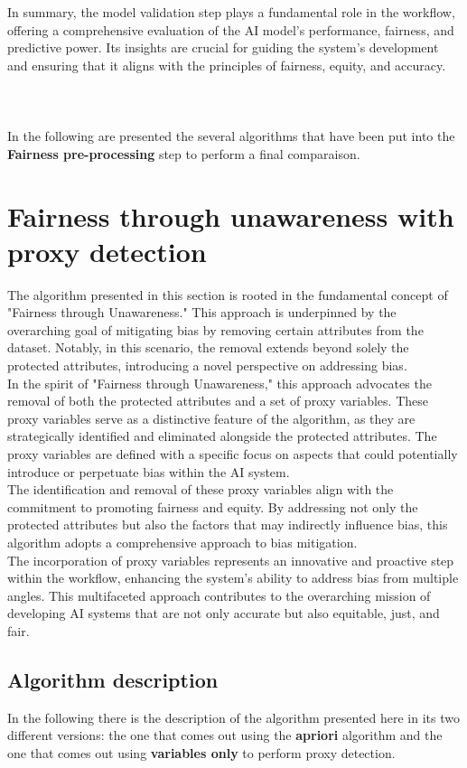 \documentclass[12pt,a4paper,openright,twoside]{book}
\begin{document}
In summary, the model validation step plays a fundamental role in the workflow, offering a comprehensive evaluation of the AI model's performance, fairness, and predictive power. Its insights are crucial for guiding the system's development and ensuring that it aligns with the principles of fairness, equity, and accuracy. \\
\\
\\
\\
In the following are presented the several algorithms that have been put into the \textbf{Fairness pre-processing} step to perform a final comparaison.

\section{Fairness through unawareness with proxy detection}
The algorithm presented in this section is rooted in the fundamental concept of "Fairness through Unawareness." This approach is underpinned by the overarching goal of mitigating bias by removing certain attributes from the dataset. Notably, in this scenario, the removal extends beyond solely the protected attributes, introducing a novel perspective on addressing bias. \\
In the spirit of "Fairness through Unawareness," this approach advocates the removal of both the protected attributes and a set of proxy variables. These proxy variables serve as a distinctive feature of the algorithm, as they are strategically identified and eliminated alongside the protected attributes. The proxy variables are defined with a specific focus on aspects that could potentially introduce or perpetuate bias within the AI system. \cite{Gupta2018ProxyF}\\
The identification and removal of these proxy variables align with the commitment to promoting fairness and equity. By addressing not only the protected attributes but also the factors that may indirectly influence bias, this algorithm adopts a comprehensive approach to bias mitigation. \\
The incorporation of proxy variables represents an innovative and proactive step within the workflow, enhancing the system's ability to address bias from multiple angles. This multifaceted approach contributes to the overarching mission of developing AI systems that are not only accurate but also equitable, just, and fair.

\subsection{Algorithm description}
In the following there is the description of the algorithm presented here in its two different versions: the one that comes out using the \textbf{apriori} algorithm and the one that comes out using \textbf{variables only} to perform proxy detection. \\
\end{document}
